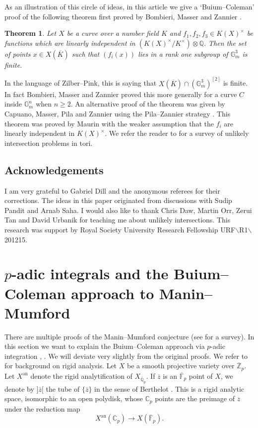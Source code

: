 \documentclass{amsart}
\def\Z{\mathbb Z}
\def\Q{\mathbb Q}
\newcommand{\an}{\mathrm{an}}
\newtheorem{theorem}{Theorem}
\theoremstyle{definition}
\newcommand{\F}{\mathbb{F}}
\begin{document}
As an illustration of this circle of ideas, in this article we give a `Buium--Coleman' proof of the following theorem first proved by Bombieri, Masser and Zannier \cite{BMZ99}.
\begin{theorem}\label{thm:main}
Let $X$ be a curve over a number field $K$ and $f_1 ,f_2 ,f_3 \in K(X)^\times $ be functions which are linearly independent in $(K(X)^\times /K^\times )\otimes \Q $. Then the set of points $x\in X(\overline{K})$ such that $(f_i (x))$ lies in a rank one subgroup of $\mathbb{G}_m ^3 $ is finite.
\end{theorem}
In the language of Zilber--Pink, this is saying that $X(\overline{K})\cap (\mathbb{G}_m ^3 )^{[2]}$ is finite. In fact Bombieri, Masser and Zannier proved this more generally for a curve $C$ inside $\mathbb{G}_m ^n $ when $n\geq 2$. An alternative proof of the theorem was given by Capuano, Masser, Pila and Zannier \cite{CMPZ} using the Pila--Zannier strategy \cite{PZ}.
This theorem was proved by Maurin \cite{maurin} with the weaker assumption that the $f_i$ are linearly independent in $K(X)^\times $. We refer the reader to \cite{Zann} for a survey of unlikely intersection problems in tori.

\subsection*{Acknowledgements}
I am very grateful to Gabriel Dill and the anonymous referees for their corrections. The ideas in this paper originated from discussions with Sudip Pandit and Arnab Saha. I would also like to thank Chris Daw, Martin Orr, Zerui Tan and David Urbanik for teaching me about unlikely intersections. This research was support by Royal Society University Research Fellowship URF$\backslash $R1$\backslash $201215.

\section{$p$-adic integrals and the Buium--Coleman approach to Manin--Mumford}
There are multiple proofs of the Manin--Mumford conjecture (see \cite{tzermias} for a survey). In this section we want to explain the Buium--Coleman approach via $p$-adic integration \cite{buium:96}, \cite{coleman:ramified}. We will deviate very slightly from the original proofs. We refer to \cite{FvdP} for background on rigid analysis. Let $X$ be a smooth projective variety over $\overline{\Z }_p $. Let $X^{\an }$ denote the rigid analytification of $X_{\overline{\Q }_p }$. If $\overline{z}$ is an $\overline{\F }_p$ point of $X$, we denote by $]\overline{z}[$ the tube of $\{ \overline{z} \}$ in the sense of Berthelot \cite{LS}. This is a rigid analytic space, isomorphic to an open polydisk, whose $\mathbb{C}_p $ points are the preimage of $\overline{z}$ under the reduction map
\[
X^{\mathrm{an}}(\mathbb{C}_p )\to X(\overline{\F }_p ).
\]
\end{document}
